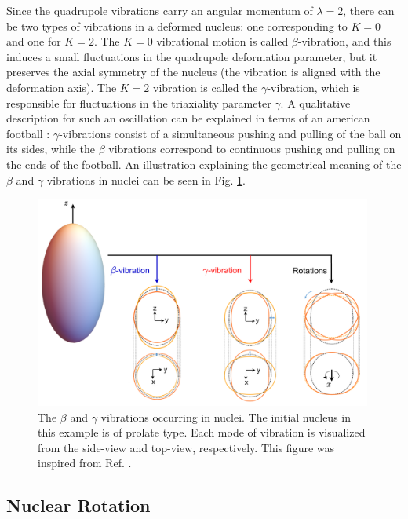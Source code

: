 Since the quadrupole vibrations carry an angular momentum of $\lambda=2$, there can be two types of vibrations in a deformed nucleus: one corresponding to $K=0$ and one for $K=2$. The $K=0$ vibrational motion is called $\beta$-vibration, and this induces a small fluctuations in the quadrupole deformation parameter, but it preserves the axial symmetry of the nucleus (the vibration is aligned with the deformation axis). The $K=2$ vibration is called the $\gamma$-vibration, which is responsible for fluctuations in the triaxiality parameter $\gamma$. A qualitative description for such an oscillation can be explained in terms of an american football \cite{krane1991introductory}: $\gamma$-vibrations consist of a simultaneous pushing and pulling of the ball on its sides, while the $\beta$ vibrations correspond to continuous pushing and pulling on the ends of the football. An illustration explaining the geometrical meaning of the $\beta$ and $\gamma$ vibrations in nuclei can be seen in Fig. \ref{rotation-vibration-geometrics}.
\begin{figure}
    \centering
    \includegraphics[width=0.99\textwidth]{Chapters/Figures/rotationsVibrations_Rotations.pdf}
    \caption{The $\beta$ and $\gamma$ vibrations occurring in nuclei. The initial nucleus in this example is of prolate type. Each mode of vibration is visualized from the side-view and top-view, respectively. This figure was inspired from Ref. \cite{li2022model}.}
    \label{rotation-vibration-geometrics}
\end{figure}

\subsection{Nuclear Rotation}

